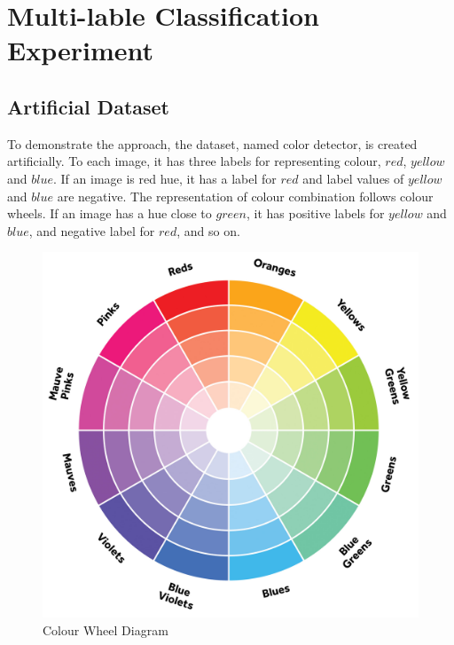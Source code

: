 
\chapter{Multi-lable Classification Experiment} %
\label{Chapter7}

\section{Artificial Dataset}

To demonstrate the approach, the dataset, named color detector, is created artificially. To each image, it has three labels for representing colour, $red$, $yellow$ and $blue$. If an image is red hue, it has a label for $red$ and label values of $yellow$ and $blue$ are negative. The representation of colour combination follows colour wheels. If an image has a hue close to $green$, it has positive labels for $yellow$ and $blue$, and negative label for $red$, and so on.
\graphicspath{ {./Figures/} }
\begin{figure}[!htb]
\centering
\includegraphics[scale=0.1]{color_wheel.jpg}
\caption{\label{fig:perceptron}Colour Wheel Diagram}
\end{figure}




















